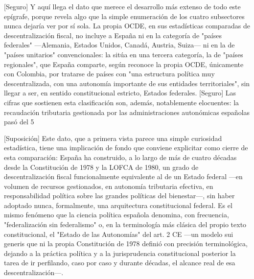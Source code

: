 \documentclass[10pt,a4paper]{article}
\begin{document}
[Seguro] Y aquí llega el dato que merece el desarrollo más extenso de todo este epígrafe, porque revela algo que la simple enumeración de los cuatro subsectores nunca dejaría ver por sí sola. La propia OCDE, en sus estadísticas comparadas de descentralización fiscal, no incluye a España ni en la categoría de "países federales" —Alemania, Estados Unidos, Canadá, Austria, Suiza— ni en la de "países unitarios" convencionales: la sitúa en una tercera categoría, la de "países regionales", que España comparte, según reconoce la propia OCDE, únicamente con Colombia, por tratarse de países con "una estructura política muy descentralizada, con una autonomía importante de sus entidades territoriales", sin llegar a ser, en sentido constitucional estricto, Estados federales. [Seguro] Las cifras que sostienen esta clasificación son, además, notablemente elocuentes: la recaudación tributaria gestionada por las administraciones autonómicas españolas pasó del 5%

[Suposición] Este dato, que a primera vista parece una simple curiosidad estadística, tiene una implicación de fondo que conviene explicitar como cierre de esta comparación: España ha construido, a lo largo de más de cuatro décadas desde la Constitución de 1978 y la LOFCA de 1980, un grado de descentralización fiscal funcionalmente equivalente al de un Estado federal —en volumen de recursos gestionados, en autonomía tributaria efectiva, en responsabilidad política sobre las grandes políticas del bienestar—, sin haber adoptado nunca, formalmente, una arquitectura constitucional federal. Es el mismo fenómeno que la ciencia política española denomina, con frecuencia, "federalización sin federalismo" o, en la terminología más clásica del propio texto constitucional, el "Estado de las Autonomías" del art. 2 CE —un modelo sui generis que ni la propia Constitución de 1978 definió con precisión terminológica, dejando a la práctica política y a la jurisprudencia constitucional posterior la tarea de ir perfilando, caso por caso y durante décadas, el alcance real de esa descentralización—.
\end{document}
